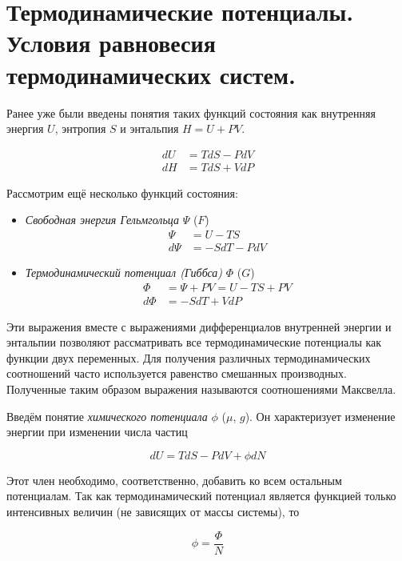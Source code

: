 \section{Термодинамические потенциалы. Условия равновесия термодинамических систем.}

Ранее уже были введены понятия таких функций состояния как внутренняя энергия $U$, энтропия $S$ и энтальпия $H = U + PV$.

\begin{align}
    dU &= T dS - P dV \\
    dH &= T dS + V dP
\end{align}

Рассмотрим ещё несколько функций состояния:

\begin{itemize}
    \item \textit{Свободная энергия Гельмгольца} $\Psi$ ($F$)
    \begin{align}
        \Psi &= U - TS \\
        d \Psi &= -S dT - PdV
    \end{align}
    \item \textit{Термодинамический потенциал (Гиббса)} $\Phi$ ($G$)
    \begin{align}
        \Phi &= \Psi + PV = U - TS + PV \\
        d \Phi &= -S dT + V dP
    \end{align}
\end{itemize}

Эти выражения вместе с выражениями дифференциалов внутренней энергии и энтальпии позволяют рассматривать все термодинамические потенциалы как функции двух переменных. Для получения различных термодинамических соотношений часто используется равенство смешанных производных. Полученные таким образом выражения называются соотношениями Максвелла.

Введём понятие \textit{химического потенциала} $\phi$ ($\mu$, $g$). Он характеризует изменение энергии при изменении числа частиц

\begin{equation}
    dU = T dS - P dV + \phi dN
\end{equation}

\noindent
Этот член необходимо, соответственно, добавить ко всем остальным потенциалам. Так как термодинамический потенциал является функцией только интенсивных величин (не зависящих от массы системы), то 

\begin{equation}
    \phi = \frac{\Phi}{N}
\end{equation}

